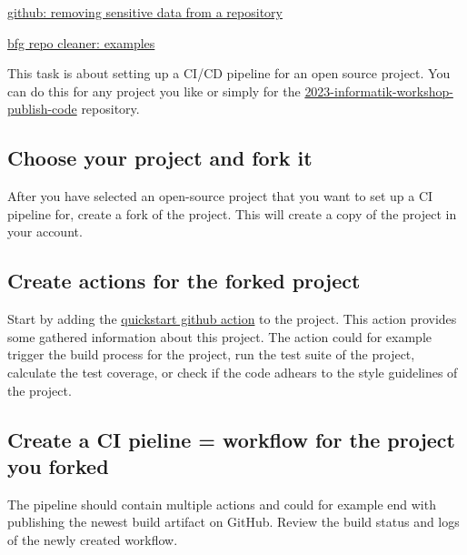 \documentclass[paper=a4]{scrartcl}
\begin{document}

	\begin{literature} %
  		\item \href{https://docs.github.com/en/authentication/keeping-your-account-and-data-secure/removing-sensitive-data-from-a-repository}{github: removing sensitive data from a repository}
  		\item \href{https://rtyley.github.io/bfg-repo-cleaner/}{bfg repo cleaner: examples}
	\end{literature}

	This task is about setting up a CI/CD pipeline for an open source project. You can do this for any project you like or simply for the \href{https://github.com/marc-philipp-knechtle/2023-informatik-workshop-publish-code}{2023-informatik-workshop-publish-code} repository.
	\subsection*{Choose your project and fork it}
		After you have selected an open-source project that you want to set up a CI pipeline for,
create a fork of the project. This will create a copy of the project in your account.

	\subsection*{Create actions for the forked project}
		Start by adding the \href{https://docs.github.com/en/actions/quickstart}{quickstart github action} to the project. This action provides some gathered information about this project.
		\newline
		The action could for example trigger the build process for the project, run the test suite of the project, calculate the test coverage, or check if the code adhears to the style guidelines of the project. 
	
	\subsection*{Create a CI pieline = workflow for the project you forked} 
		The pipeline should contain multiple actions and could for example end with publishing the newest build artifact on GitHub. Review the build status and logs of the newly created workflow.
	
\end{document}
